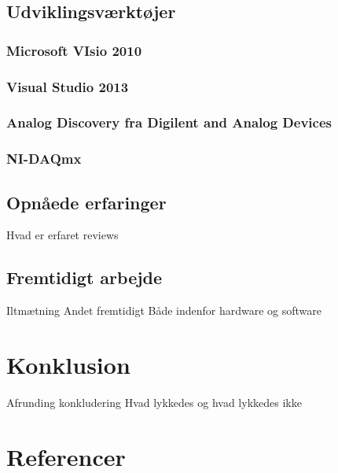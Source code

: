 \section{Udviklingsværktøjer}
\subsection{Microsoft VIsio 2010}
\subsection{Visual Studio 2013}
\subsection{Analog Discovery fra Digilent and Analog Devices}
\subsection{NI-DAQmx}

\section{Opnåede erfaringer}
Hvad er erfaret
reviews
\section{Fremtidigt arbejde}
Iltmætning
Andet fremtidigt
Både indenfor hardware og software
\chapter{Konklusion}
Afrunding
konkludering
Hvad lykkedes og hvad lykkedes ikke
\chapter{Referencer}